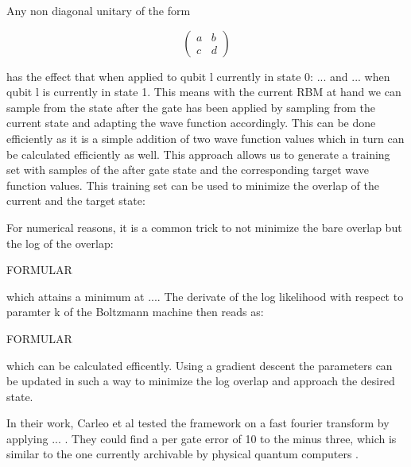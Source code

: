 Any non diagonal unitary of the form 

\begin{equation}
    \begin{pmatrix}
        a & b \\
        c & d
    \end{pmatrix}
\end{equation}

has the effect that when applied to qubit l currently in state 0: ... and ... when qubit l is currently in state 1. This means 
with the current RBM at hand we can sample from the state after the gate has been applied by sampling from the current state 
and adapting the wave function accordingly. This can be done efficiently as it is a simple addition of two wave function values 
which in turn can be calculated efficiently as well. This approach allows us to generate a training set with samples of the 
after gate state and the corresponding target wave function values. This training set can be used to minimize the overlap of
the current and the target state:

For numerical reasons, it is a common trick to not minimize the bare overlap but the log of the overlap:

FORMULAR

which attains a minimum at .... The derivate of the log likelihood with respect to paramter k of the Boltzmann machine then 
reads as:

FORMULAR

which can be calculated efficently. Using a gradient descent the parameters can be updated in such a way to minimize the log
overlap and approach the desired state.

In their work, Carleo et al tested the framework on a fast fourier transform by applying ... . They could find a per gate 
error of 10 to the minus three, which is similar to the one currently archivable by physical quantum computers \cite{}.
